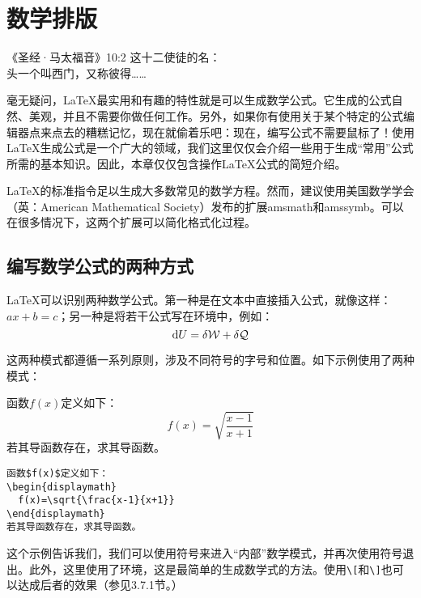 \chapter{数学排版}

\begin{epigraphe}{《圣经·马太福音》10:2}
  这十二使徒的名：\\头一个叫西门，又称彼得……
\end{epigraphe}

毫无疑问，\LaTeX 最实用和有趣的特性就是可以生成数学公式。它生成的公式自然、美观，并且不需要你做任何工作。另外，如果你有使用关于某个特定的公式编辑器点来点去的糟糕记忆，现在就偷着乐吧：现在，编写公式不需要鼠标了！使用\LaTeX 生成公式是一个广大的领域，我们这里仅仅会介绍一些用于生成``常用''公式所需的基本知识。因此，本章仅仅包含操作\LaTeX 公式的简短介绍。

\begin{ii}
\LaTeX 的标准指令足以生成大多数常见的数学方程。然而，建议使用美国数学学会（英：American Mathematical Society）发布的扩展amsmath和amssymb。可以在很多情况下，这两个扩展可以简化格式化过程。
\end{ii}

\section{编写数学公式的两种方式}

\LaTeX 可以识别两种数学公式。第一种是在文本中直接插入公式，就像这样：$ax+b=c$；另一种是将若干公式写在环境中，例如：
$$
{\rm d} U = \delta \mathcal{W} +\delta \mathcal{Q} 
$$

这两种模式都遵循一系列原则，涉及不同符号的字号和位置。如下示例使用了两种模式：

\begin{codelist}[3.1]{
  函数$f(x)$定义如下：
\begin{displaymath}
  f(x)=\sqrt{\frac{x-1}{x+1}}
\end{displaymath}
若其导函数存在，求其导函数。
}
\begin{verbatim}
函数$f(x)$定义如下：
\begin{displaymath}
  f(x)=\sqrt{\frac{x-1}{x+1}}
\end{displaymath}
若其导函数存在，求其导函数。\end{verbatim}
\end{codelist}

这个示例告诉我们，我们可以使用\dm{\$}符号来进入``内部''数学模式，并再次使用\dm{\$}符号退出。此外，这里使用了环境，这是最简单的生成数学式的方法。使用\verb|\[|和\verb|\]|也可以达成后者的效果（参见3.7.1节。）

